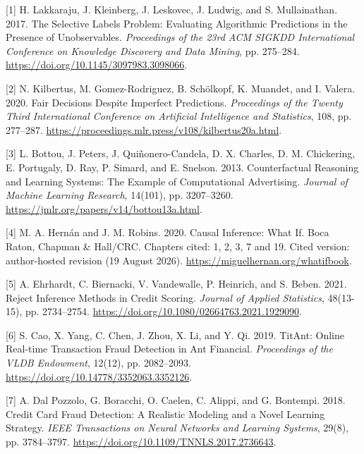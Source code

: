 \documentclass[
  11pt,
]{article}
\newlength{\cslhangindent}
\newlength{\cslentryspacingunit} %
\newenvironment{CSLReferences}[2] %
 {%
  \setlength{\parindent}{0pt}
  \ifodd #1
  \let\oldpar\par
  \def\par{\hangindent=\cslhangindent\oldpar}
  \fi
  \setlength{\parskip}{#2\cslentryspacingunit}
 }%
 {}
\begin{document}
\hypertarget{refs}{}
\begin{CSLReferences}{1}{1}
\leavevmode{}%
{[}1{]} H. Lakkaraju, J. Kleinberg, J. Leskovec, J. Ludwig, and S.
Mullainathan. 2017. The Selective Labels Problem: Evaluating Algorithmic
Predictions in the Presence of Unobservables. \emph{Proceedings of the
23rd ACM SIGKDD International Conference on Knowledge Discovery and Data
Mining}, pp. 275--284. \url{https://doi.org/10.1145/3097983.3098066}.

\leavevmode{}%
{[}2{]} N. Kilbertus, M. Gomez-Rodriguez, B. Schölkopf, K. Muandet, and
I. Valera. 2020. Fair Decisions Despite Imperfect Predictions.
\emph{Proceedings of the Twenty Third International Conference on
Artificial Intelligence and Statistics}, 108, pp. 277--287.
\url{https://proceedings.mlr.press/v108/kilbertus20a.html}.

\leavevmode{}%
{[}3{]} L. Bottou, J. Peters, J. Quiñonero-Candela, D. X. Charles, D. M.
Chickering, E. Portugaly, D. Ray, P. Simard, and E. Snelson. 2013.
Counterfactual Reasoning and Learning Systems: The Example of
Computational Advertising. \emph{Journal of Machine Learning Research},
14(101), pp. 3207--3260.
\url{https://jmlr.org/papers/v14/bottou13a.html}.

\leavevmode{}%
{[}4{]} M. A. Hernán and J. M. Robins. 2020. Causal Inference: What If.
Boca Raton, Chapman \& Hall/CRC. Chapters cited: 1, 2, 3, 7 and 19.
Cited version: author-hosted revision (19 August 2026).
\url{https://miguelhernan.org/whatifbook}.

\leavevmode{}%
{[}5{]} A. Ehrhardt, C. Biernacki, V. Vandewalle, P. Heinrich, and S.
Beben. 2021. Reject Inference Methods in Credit Scoring. \emph{Journal
of Applied Statistics}, 48(13-15), pp. 2734--2754.
\url{https://doi.org/10.1080/02664763.2021.1929090}.

\leavevmode{}%
{[}6{]} S. Cao, X. Yang, C. Chen, J. Zhou, X. Li, and Y. Qi. 2019.
TitAnt: Online Real-time Transaction Fraud Detection in Ant Financial.
\emph{Proceedings of the VLDB Endowment}, 12(12), pp. 2082--2093.
\url{https://doi.org/10.14778/3352063.3352126}.

\leavevmode{}%
{[}7{]} A. Dal Pozzolo, G. Boracchi, O. Caelen, C. Alippi, and G.
Bontempi. 2018. Credit Card Fraud Detection: A Realistic Modeling and a
Novel Learning Strategy. \emph{IEEE Transactions on Neural Networks and
Learning Systems}, 29(8), pp. 3784--3797.
\url{https://doi.org/10.1109/TNNLS.2017.2736643}.


\end{CSLReferences}
\end{document}
